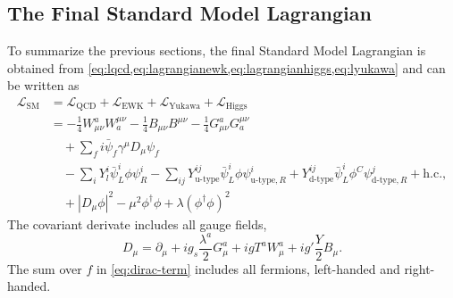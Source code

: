 \subsection{The Final Standard Model Lagrangian}
\label{subsec:final-lagrangian}
To summarize the previous sections, the final Standard Model Lagrangian is obtained from \cref{eq:lqcd,eq:lagrangianewk,eq:lagrangianhiggs,eq:lyukawa} and can be written as
\begin{align}
  \mathcal{L}_\text{SM} &= \mathcal{L}_\text{QCD} + \mathcal{L}_\text{EWK} + \mathcal{L}_\text{Yukawa} + \mathcal{L}_\text{Higgs} \\
   &= - \frac{1}{4}W_{\mu\nu}^aW^{\mu\nu}_{a} - \frac{1}{4} B_{\mu\nu}B^{\mu\nu} - \frac{1}{4}G_{\mu\nu}^aG^{\mu\nu}_{a} \\
   \label{eq:dirac-term}
   & \quad + \sum_f i \bar{\psi}_f\gamma^\mu D_\mu\psi_f \\
   & \quad - \sum_{i} Y_l^i \bar{\psi}^{i}_{L} \phi \psi^{i}_{R} - \sum_{ij} Y_{\text{u-type}}^{ij} \bar{\psi}^{i}_{L} \phi \psi^{i}_{\text{u-type},R} + Y_{\text{d-type}}^{ij} \bar{\psi}^{i}_{L} \phi^C \psi^{j}_{\text{d-type}, R} + \text{h.c.},  \\
   & \quad + |D_\mu\phi|^2 - \mu^2\phi^\dagger\phi + \lambda \left(\phi^\dagger\phi \right)^2
\end{align}
The covariant derivate includes all gauge fields,
\begin{equation}
  D_\mu = \partial_\mu + i g_s \frac{\lambda^a}{2} G_\mu^a + igT^aW_\mu^a + ig'\frac{Y}{2}B_\mu.
\end{equation}
The sum over $f$ in \cref{eq:dirac-term} includes all fermions, left-handed and right-handed.


